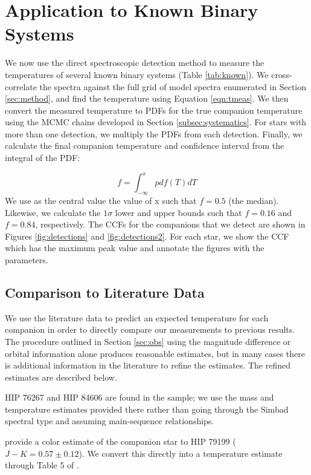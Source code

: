 \documentclass{emulateapj}
\begin{document}
\section{Application to Known Binary Systems}
\label{sec:results}

We now use the direct spectroscopic detection method to measure the temperatures of several known binary systems (Table \ref{tab:known}). We cross-correlate the spectra against the full grid of model spectra enumerated in Section \ref{sec:method}, and find the temperature using Equation \ref{eqn:tmeas}. We then convert the measured temperature to PDFs for the true companion temperature using the MCMC chains developed in Section \ref{subsec:systematics}. For stars with more than one detection, we multiply the PDFs from each detection. Finally, we calculate the final companion temperature and confidence interval from the integral of the PDF:

\begin{equation}
f = \int_{-\infty}^x {pdf(T)dT}
\end{equation}
We use as the central value the value of x such that $f=0.5$ (the median). Likewise, we calculate the $1 \sigma$ lower and upper bounds such that $f = 0.16$ and $f = 0.84$, respectively. The CCFs for the companions that we detect are shown in Figures \ref{fig:detections} and \ref{fig:detections2}. For each star, we show the CCF which has the maximum peak value and annotate the figures with the parameters.

\subsection{Comparison to Literature Data}
\label{subsec:expected_teffs}
We use the literature data to predict an expected temperature for each companion in order to directly compare our measurements to previous results. The procedure outlined in Section \ref{sec:obs} using the magnitude difference or orbital information alone produces reasonable estimates, but in many cases there is additional information in the literature to refine the estimates. The refined estimates are described below.

HIP 76267 and HIP 84606 are found in the \cite{David2015} sample; we use the mass and temperature estimates provided there rather than going through the Simbad spectral type and assuming main-sequence relationships.

\citet{Shatsky2002} provide a color estimate of the companion star to HIP 79199 ($J-K = 0.57 \pm 0.12$). We convert this directly into a temperature estimate through Table 5 of \citet{Pecaut2013}.
\end{document}
